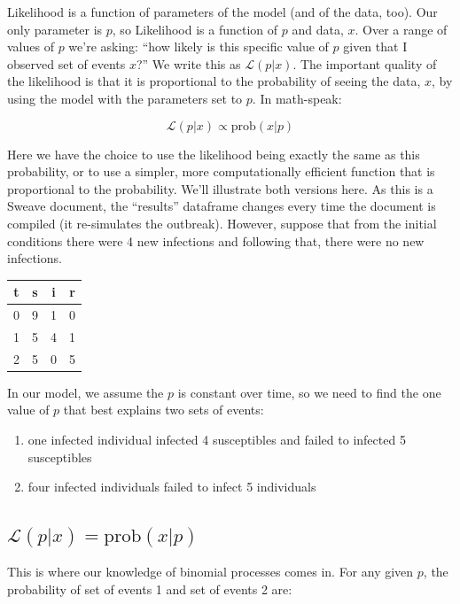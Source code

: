 \documentclass{article}
\begin{document}
Likelihood is a function of parameters of the model (and of the data, too). Our only parameter is $p$, so Likelihood is a function of $p$ and data, $x$. Over a range of values of $p$ we're asking: ``how likely is this specific value of $p$ given that I observed set of events $x$?'' We write this as $\mathcal{L}\left(p|x\right)$. The important quality of the likelihood is that it is proportional to the probability of seeing the data, $x$, by using the model with the parameters set to $p$. In math-speak:

\begin{equation}
\mathcal{L}(p|x) \propto \text{prob}(x|p)
\end{equation}

Here we have the choice to use the likelihood being exactly the same as this probability, or to use a simpler, more computationally efficient function that is proportional to the probability. We'll illustrate both versions here. As this is a Sweave document, the ``results'' dataframe changes every time the document is compiled (it re-simulates the outbreak). However, suppose that from the initial conditions there were 4 new infections and following that, there were no new infections. 


\begin{tabular}{c|c|c|c}
t & s & i & r \\
\hline 
\hline
0 & 9 & 1 & 0\\
1 & 5 & 4 & 1\\
2 & 5 & 0 & 5\\
\end{tabular}


In our model, we assume the $p$ is constant over time, so we need to find the one value of $p$ that best explains two sets of events:

\begin{enumerate}
\item one infected individual infected 4 susceptibles and failed to infected 5 susceptibles
\item four infected individuals failed to infect 5 individuals
\end{enumerate}

\subsection*{$\mathcal{L}(p|x) = \text{prob}(x|p)$}
This is where our knowledge of binomial processes comes in. For any given $p$, the probability of set of events 1 and set of events 2 are:
\end{document}
